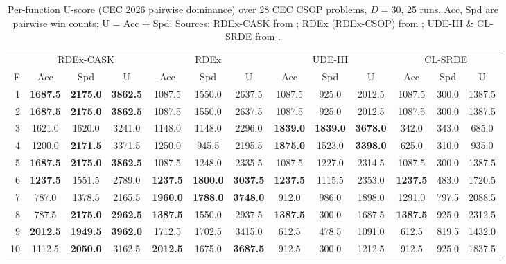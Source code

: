\documentclass[conference]{IEEEtran}
\begin{document}
\begin{table}[!t]
\centering
\caption{Per-function U-score (CEC 2026 pairwise dominance) over 28 CEC CSOP problems, $D=30$, 25 runs. Acc, Spd are pairwise win counts; U = Acc + Spd. Sources: RDEx-CASK from \cite{cask_results}; RDEx (RDEx-CSOP) from \cite{cec2025_data}; UDE-III \& CL-SRDE from \cite{cec2024_data}.}
\label{tab:uscore-perfunc}
\scriptsize
\setlength{\tabcolsep}{3pt}
\begin{tabular}{r ccc ccc ccc ccc}
\toprule
 & \multicolumn{3}{c}{RDEx-CASK} & \multicolumn{3}{c}{RDEx} & \multicolumn{3}{c}{UDE-III} & \multicolumn{3}{c}{CL-SRDE} \\
\cmidrule(lr){2-4}\cmidrule(lr){5-7}\cmidrule(lr){8-10}\cmidrule(lr){11-13}
F & Acc & Spd & U & Acc & Spd & U & Acc & Spd & U & Acc & Spd & U \\
\midrule
1  & \textbf{1687.5} & \textbf{2175.0} & \textbf{3862.5} & 1087.5 & 1550.0 & 2637.5 & 1087.5 & 925.0 & 2012.5 & 1087.5 & 300.0 & 1387.5 \\
2  & \textbf{1687.5} & \textbf{2175.0} & \textbf{3862.5} & 1087.5 & 1550.0 & 2637.5 & 1087.5 & 925.0 & 2012.5 & 1087.5 & 300.0 & 1387.5 \\
3  & 1621.0 & 1620.0 & 3241.0 & 1148.0 & 1148.0 & 2296.0 & \textbf{1839.0} & \textbf{1839.0} & \textbf{3678.0} & 342.0 & 343.0 & 685.0 \\
4  & 1200.0 & \textbf{2171.5} & 3371.5 & 1250.0 & 945.5 & 2195.5 & \textbf{1875.0} & 1523.0 & \textbf{3398.0} & 625.0 & 310.0 & 935.0 \\
5  & \textbf{1687.5} & \textbf{2175.0} & \textbf{3862.5} & 1087.5 & 1248.0 & 2335.5 & 1087.5 & 1227.0 & 2314.5 & 1087.5 & 300.0 & 1387.5 \\
6  & \textbf{1237.5} & 1551.5 & 2789.0 & \textbf{1237.5} & \textbf{1800.0} & \textbf{3037.5} & \textbf{1237.5} & 1115.5 & 2353.0 & \textbf{1237.5} & 483.0 & 1720.5 \\
7  & 787.0 & 1378.5 & 2165.5 & \textbf{1960.0} & \textbf{1788.0} & \textbf{3748.0} & 912.0 & 986.0 & 1898.0 & 1291.0 & 797.5 & 2088.5 \\
8  & 787.5 & \textbf{2175.0} & \textbf{2962.5} & \textbf{1387.5} & 1550.0 & 2937.5 & \textbf{1387.5} & 300.0 & 1687.5 & \textbf{1387.5} & 925.0 & 2312.5 \\
9  & \textbf{2012.5} & \textbf{1949.5} & \textbf{3962.0} & 1712.5 & 1702.5 & 3415.0 & 612.5 & 478.5 & 1091.0 & 612.5 & 819.5 & 1432.0 \\
10 & 1112.5 & \textbf{2050.0} & 3162.5 & \textbf{2012.5} & 1675.0 & \textbf{3687.5} & 912.5 & 300.0 & 1212.5 & 912.5 & 925.0 & 1837.5 \\

\end{tabular}
\end{table}
\end{document}
